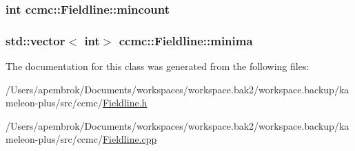 \hypertarget{classccmc_1_1_fieldline_a2f909b007d4886fa23a7e7281c946274}{
\subsubsection[{mincount}]{\setlength{\rightskip}{0pt plus 5cm}int ccmc\-::\-Fieldline\-::mincount}}\label{classccmc_1_1_fieldline_a2f909b007d4886fa23a7e7281c946274}
\hypertarget{classccmc_1_1_fieldline_ae2e528d518e0342ecf3ec1241a5eeac0}{
\subsubsection[{minima}]{\setlength{\rightskip}{0pt plus 5cm}std\-::vector$<$ int$>$ ccmc\-::\-Fieldline\-::minima}}\label{classccmc_1_1_fieldline_ae2e528d518e0342ecf3ec1241a5eeac0}


The documentation for this class was generated from the following files\-:\begin{DoxyCompactItemize}
\item 
/\-Users/apembrok/\-Documents/workspaces/workspace.\-bak2/workspace.\-backup/kameleon-\/plus/src/ccmc/\hyperlink{_fieldline_8h}{Fieldline.\-h}\item 
/\-Users/apembrok/\-Documents/workspaces/workspace.\-bak2/workspace.\-backup/kameleon-\/plus/src/ccmc/\hyperlink{_fieldline_8cpp}{Fieldline.\-cpp}\end{DoxyCompactItemize}
